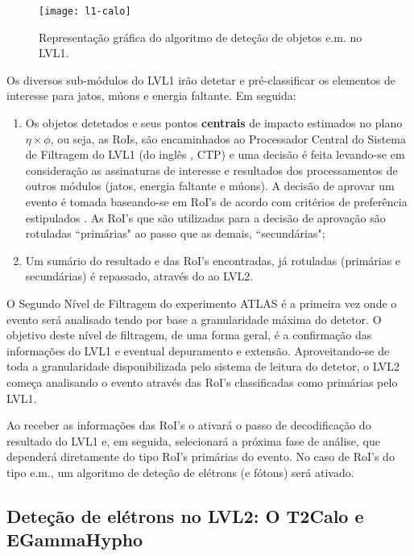 \begin{figure}
\begin{center}
\texttt{[image: l1-calo]}
\end{center}
\caption{Representação gráfica do algoritmo de deteção de objetos e.m. no LVL1.}
\label{fig:l1-calo}
\end{figure}

Os diversos sub-módulos do LVL1 irão detetar e pré-classificar os elementos de
interesse para jatos, múons e energia faltante. Em seguida:

\begin{enumerate}
\item Os objetos detetados e seus pontos \textbf{centrais} de impacto
estimados no plano $\eta\times\phi$, ou seja, as RoIs, são encaminhados ao
Processador Central do Sistema de Filtragem do LVL1 (do inglês , CTP) e uma decisão é feita levando-se em consideração as
assinaturas de interesse e resultados dos processamentos de outros módulos
(jatos, energia faltante e múons). A decisão de aprovar um evento é tomada
baseando-se em RoI's de acordo com critérios de preferência estipulados . As RoI's que são utilizadas para a decisão de aprovação são rotuladas
``primárias" ao passo que as demais, ``secundárias";

\item Um sumário do resultado e das RoI's encontradas, já rotuladas (primárias
e secundárias) é repassado, através do  ao LVL2.
\end{enumerate}

O Segundo Nível de Filtragem do experimento ATLAS é a primeira vez onde o
evento será analisado tendo por base a granularidade máxima do detetor. O
objetivo deste nível de filtragem, de uma forma geral, é a confirmação das
informações do LVL1 e eventual depuramento e extensão. Aproveitando-se de toda
a granularidade disponibilizada pelo sistema de leitura do detetor, o LVL2
começa analisando o evento através das RoI's classificadas como primárias pelo
LVL1.

Ao receber as informações das RoI's o  ativará o passo de
decodificação do resultado do LVL1 e, em seguida, selecionará a próxima fase
de análise, que dependerá diretamente do tipo RoI's primárias do evento. No
caso de RoI's do tipo e.m., um algoritmo de deteção de elétrons (e fótons)
será ativado.

\subsection{Deteção de elétrons no LVL2: O T2Calo e EGammaHypho}
\label{sec:classic-detection}

